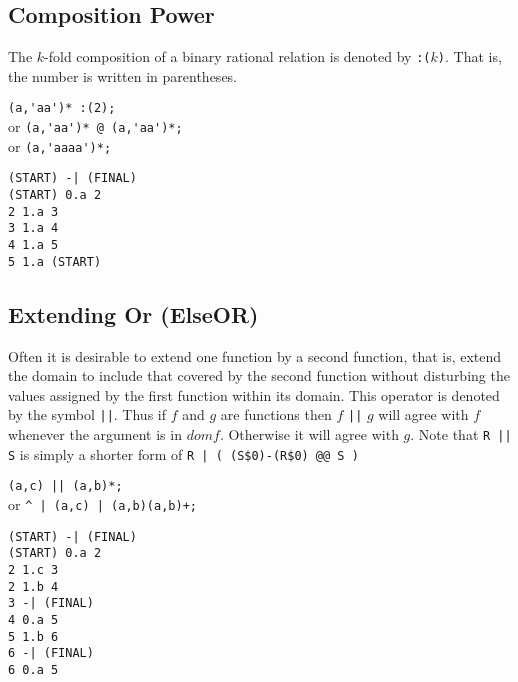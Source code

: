 \subsection{Composition Power}
The $k$-fold composition of a binary rational relation is denoted by
\verb#:(#$k$\verb#)#.
That is, the number is written in parentheses.
\begin{center}\begin{minipage}[t]{3in}\begin{minipage}[t]{3in}\begin{tabbing}
\qquad \= \verb#(a,'aa')* :(2);#\\
or \> \verb#(a,'aa')* @ (a,'aa')*;#\\
or \> \verb#(a,'aaaa')*;#
\end{tabbing}\end{minipage}\end{minipage}
\begin{minipage}[t]{1.6in}\begin{verbatim}
(START) -| (FINAL)
(START) 0.a 2
2 1.a 3
3 1.a 4
4 1.a 5
5 1.a (START)
\end{verbatim}\end{minipage}\end{center}

\subsection{Extending Or (ElseOR)}
Often it is desirable to extend one function by a second function, that is,
extend the domain to include that covered by the second function without
disturbing the values assigned by the first function within its domain.
This operator is denoted by the symbol \verb#||#.
Thus if $f$ and $g$ are functions then $f$ \verb#||# $g$ will agree with $f$
whenever the argument is in $dom f$.
Otherwise it will agree with $g$.
Note that \verb#R || S# is simply a shorter form of
\verb#R | ( (S$0)-(R$0) @@ S )#
\begin{center}\begin{minipage}[t]{3in}\begin{minipage}[t]{3in}\begin{tabbing}
\qquad \= \verb#(a,c) || (a,b)*;#\\
or \> \verb#^ | (a,c) | (a,b)(a,b)+;#
\end{tabbing}\end{minipage}\end{minipage}
\begin{minipage}[t]{1.6in}\begin{verbatim}
(START) -| (FINAL)
(START) 0.a 2
2 1.c 3
2 1.b 4
3 -| (FINAL)
4 0.a 5
5 1.b 6
6 -| (FINAL)
6 0.a 5
\end{verbatim}\end{minipage}\end{center}

